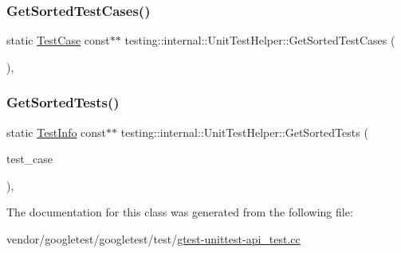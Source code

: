 \mbox{\label{classtesting_1_1internal_1_1_unit_test_helper_a9a549307062083d10358638af272cc98}} 
\subsubsection{\texorpdfstring{Get\+Sorted\+Test\+Cases()}{GetSortedTestCases()}}
{\footnotesize\ttfamily static \hyperlink{classtesting_1_1_test_case}{Test\+Case} const$\ast$$\ast$ testing\+::internal\+::\+Unit\+Test\+Helper\+::\+Get\+Sorted\+Test\+Cases (\begin{DoxyParamCaption}{ }\end{DoxyParamCaption})\hspace{0.3cm}{\ttfamily [inline]}, {\ttfamily [static]}}

\mbox{\label{classtesting_1_1internal_1_1_unit_test_helper_a02602d22fb74566dad78c0c9d4f24e78}} 
\subsubsection{\texorpdfstring{Get\+Sorted\+Tests()}{GetSortedTests()}}
{\footnotesize\ttfamily static \hyperlink{classtesting_1_1_test_info}{Test\+Info} const$\ast$$\ast$ testing\+::internal\+::\+Unit\+Test\+Helper\+::\+Get\+Sorted\+Tests (\begin{DoxyParamCaption}\item[{const \hyperlink{classtesting_1_1_test_case}{Test\+Case} $\ast$}]{test\+\_\+case }\end{DoxyParamCaption})\hspace{0.3cm}{\ttfamily [inline]}, {\ttfamily [static]}}



The documentation for this class was generated from the following file\+:\begin{DoxyCompactItemize}
\item 
vendor/googletest/googletest/test/\hyperlink{gtest-unittest-api__test_8cc}{gtest-\/unittest-\/api\+\_\+test.\+cc}\end{DoxyCompactItemize}
